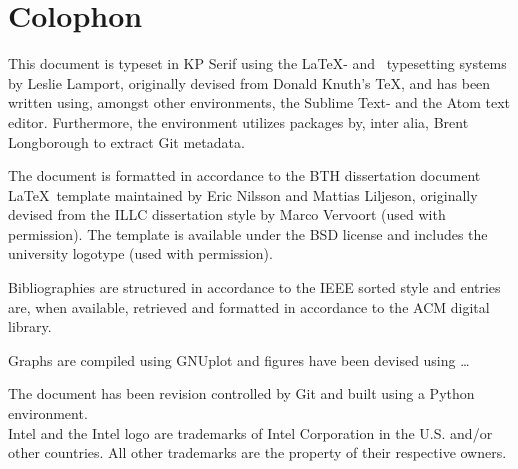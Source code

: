 
\chapter*{Colophon}
\label{cha:colophon}
This document is typeset in KP Serif using the \LaTeX - and \BibTeX\ typesetting systems by Leslie Lamport, originally devised from Donald Knuth's \TeX , and has been written using, amongst other environments, the Sublime Text- and the Atom text editor.
Furthermore, the environment utilizes packages by, inter alia, Brent Longborough to extract Git metadata.

The document is formatted in accordance to the BTH dissertation document \LaTeX\ template maintained by Eric Nilsson and Mattias Liljeson, originally devised from the ILLC dissertation style by Marco Vervoort (used with permission).
The template is available under the BSD license and includes the university logotype (used with permission).

Bibliographies are structured in accordance to the IEEE sorted style and entries are, when available, retrieved and formatted in accordance to the ACM digital library.

Graphs are compiled using GNUplot and figures have been devised using \ldots\

The document has been revision controlled by Git and built using a Python environment.\\

\noindent
Intel and the Intel logo are trademarks of Intel Corporation in the U.S. and/or other countries.
All other trademarks are the property of their respective owners.






